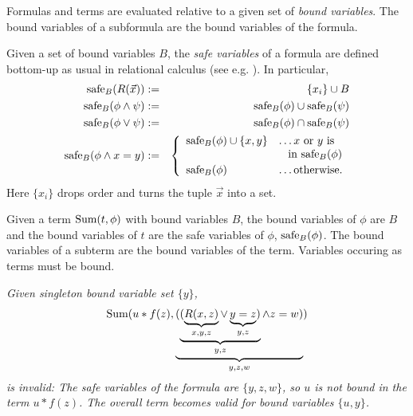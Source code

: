 Formulas and terms are evaluated relative to a given set of
{\em bound variables}.
The bound variables of a subformula are the bound variables of the formula.

Given a set of bound variables $B$,
the {\em safe variables} of a formula are defined bottom-up
as usual in relational
calculus (see e.g. \cite{DBLP:books/aw/AbiteboulHV95}). In particular,
\begin{eqnarray*}
\mbox{safe}_B(R(\vec{x})) &:=& \{x_i\} \cup B \\
\mbox{safe}_B(\phi \land \psi) &:=& \mbox{safe}_B(\phi) \cup \mbox{safe}_B(\psi) \\
\mbox{safe}_B(\phi \lor \psi)  &:=& \mbox{safe}_B(\phi) \cap \mbox{safe}_B(\psi) \\
\mbox{safe}_B(\phi \land x = y) &:=&
\left\{\begin{array}{ll}
\mbox{safe}_B(\phi) \cup \{ x, y \} &\dots
\mbox{$x$ or $y$ is} \\
&\;\;\; \mbox{in $\mbox{safe}_B(\phi)$} \\[.5ex]
\mbox{safe}_B(\phi) &\dots \mbox{otherwise}.
\end{array} \right.
\end{eqnarray*}
Here $\{x_i\}$ drops order and turns the tuple $\vec{x}$ into a set.

Given a term $\mbox{Sum}(t, \phi)$ with bound variables $B$,
the bound variables of $\phi$ are $B$ and the bound variables of $t$ are
the safe variables of $\phi$, $\mbox{safe}_B(\phi)$.
The bound variables of a subterm are the bound variables of the term.
Variables occuring as terms must be bound.

\begin{example}\em
Given singleton bound variable set $\{ y \}$,
\[ \mbox{Sum}(u * f(z), \underbrace{(\underbrace{(\underbrace{R(x, z)}_{x,y,z} \lor \underbrace{y=z}_{y,z})}_{y,z} \land z = w)}_{y,z,w}) \]
is invalid: The safe variables of the formula are
$\{y,z,w\}$, so $u$ is not bound in the term $u * f(z)$. The overall term
becomes valid for bound variables $\{u,y\}$.
\punto
\end{example}


\def\db{{\cal{A}}}

